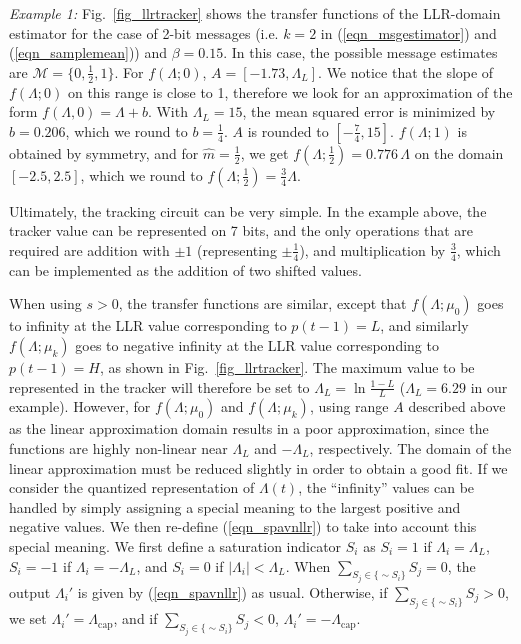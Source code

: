 \documentclass[12pt,journal,twoside,draftcls,onecolumn]{IEEEtran}
\begin{document}
	\emph{Example 1:}
	Fig.~\ref{fig_llrtracker} shows the transfer functions of the LLR-domain estimator for the case of 2-bit messages (i.e. $k=2$ in (\ref{eqn_msgestimator}) and (\ref{eqn_samplemean})) and $\beta=0.15$. In this case, the possible message estimates are $\mathcal{M} = \{0, \frac{1}{2}, 1\}$.
	For $f(\Lambda; 0)$, $A=[-1.73, \Lambda_L]$. We notice that the slope of $f(\Lambda; 0)$ on this range is close to 1, therefore we look for an approximation of the form $f(\Lambda, 0) = \Lambda + b$. 
	With $\Lambda_L=15$, the mean squared error is minimized by $b=0.206$, which we round to $b=\frac{1}{4}$. $A$ is rounded to $[-\frac{7}{4}, 15]$.
	$f(\Lambda; 1)$ is obtained by symmetry, and for $\hat{m}=\frac{1}{2}$, we get $f(\Lambda; \frac{1}{2}) = 0.776 \, \Lambda$ on the domain $[-2.5,2.5]$, which we round to $f(\Lambda; \frac{1}{2}) = \frac{3}{4} \Lambda$.
	
	Ultimately, the tracking circuit can be very simple. In the example above, the tracker value can be represented on 7 bits, and the only operations that are required are addition with $\pm1$ (representing $\pm \frac{1}{4}$), and multiplication by $\frac{3}{4}$, which can be implemented as the addition of two shifted values.
	
	When using $s>0$, the transfer functions are similar, except that $f(\Lambda; \mu_0)$ goes to infinity at the LLR value corresponding to $p(t-1)=L$, and similarly $f(\Lambda; \mu_k)$ goes to negative infinity at the LLR value corresponding to $p(t-1)=H$, as shown in Fig.~\ref{fig_llrtracker}. The maximum value to be represented in the tracker will therefore be set to $\Lambda_L = \ln \frac{1-L}{L}$ ($\Lambda_L=6.29$ in our example). However, for $f(\Lambda; \mu_0)$ and $f(\Lambda; \mu_k)$, using range $A$ described above as the linear approximation domain results in a poor approximation, since the functions are highly non-linear near $\Lambda_L$ and $-\Lambda_L$, respectively. The domain of the linear approximation must be reduced slightly in order to obtain a good fit.
	If we consider the quantized representation of $\Lambda(t)$, the ``infinity'' values can be handled by simply assigning a special meaning to the largest positive and negative values. We then re-define (\ref{eqn_spavnllr}) to take into account this special meaning. We first define
	a saturation indicator $S_i$ as $S_i = 1$ if $\Lambda_i = \Lambda_L$, $S_i = -1$ if $\Lambda_i = -\Lambda_L$, and $S_i=0$ if $|\Lambda_i| < \Lambda_L$.
	When $\sum_{S_j \in \{\sim S_i\}} S_j = 0$, the output $\Lambda_{i}'$ is given by (\ref{eqn_spavnllr}) as usual. Otherwise, if $\sum_{S_j \in \{\sim S_i\}} S_j > 0$, we set $\Lambda_{i}' = \Lambda_\mathrm{cap}$, and if $\sum_{S_j \in \{\sim S_i\}} S_j < 0$, $\Lambda_{i}' = -\Lambda_\mathrm{cap}$.
	
\end{document}
